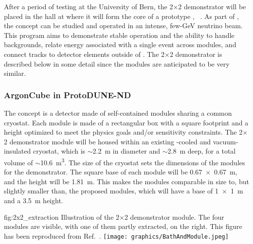 After a period of testing at the University of Bern, the  2$\times$2 demonstrator will be placed in the    hall at  where it will form the core of a prototype   , ~\cite{bib:docdb12571}.   As part of  , the  concept can be studied and operated in an intense, few-GeV neutrino beam.  This program aims to demonstrate stable operation and the ability to handle backgrounds, relate energy associated with a single event across  modules, and connect tracks to detector elements outside of .  The  2$\times$2 demonstrator is described below in some detail since the    modules are anticipated to be very similar.


\subsubsection{ArgonCube in ProtoDUNE-ND}
\label{sec:appx-nd:2x2-design}


The   concept is a detector made of self-contained  modules sharing a common cryostat. Each module is made of a rectangular box with a square footprint and a height optimized to meet the physics goals and/or sensitivity constraints. The  2$\times$2 demonstrator module will be housed within an existing \lntwo-cooled and vacuum-insulated cryostat, 
which is $\sim$\SI{2.2}{\metre} in diameter and $\sim$\SI{2.8}{\metre} deep, for a total volume of $\sim$\SI{10.6}{\metre\cubed}. The size of the cryostat sets the dimensions of the modules for the demonstrator. The square base of each module will be \SI{0.67 x 0.67}{\metre}, and the height will be \SI{1.81}{\metre}. This makes the modules comparable in size to, but slightly smaller than, the proposed     modules, which will have a base of \SI{1 x 1}{\metre} and a \SI{3.5}{\metre} height.

\begin{dunefigure} %
{fig:2x2_extraction}
{Illustration of the  2$\times$2 demonstrator module. The four modules are visible, with one of them partly extracted, on the right. This figure has been reproduced from Ref.~\cite{argoncube_loi}.}
\texttt{[image: graphics/BathAndModule.jpeg]}
\end{dunefigure}

